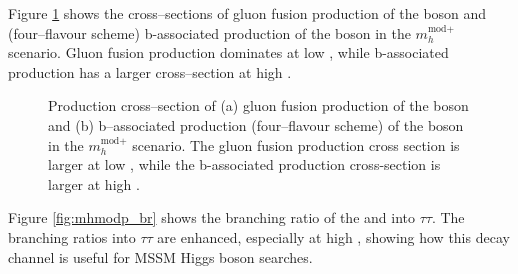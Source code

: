 Figure \ref{fig:mhmodp_xs} shows the cross--sections of
gluon fusion production of the \PHiggs boson and (four--flavour scheme) b-associated
production of the \PHiggsps boson in the $m_h^{\text{mod+}}$ scenario. Gluon fusion 
production dominates at low \tanb, while b-associated production has a larger cross--section
at high \tanb.

\begin{figure}[h!]
\begin{center}
\end{center}
\caption{Production cross--section of (a) gluon fusion production of the \PHiggs boson and
(b) b--associated production (four--flavour scheme) of the \PHiggsps boson in the $m_{h}^{\text{mod+}}$ scenario. The gluon fusion production cross section is larger at low \tanb, while
the b-associated production cross-section is larger at high \tanb.}
\label{fig:mhmodp_xs}
\end{figure}

Figure \ref{fig:mhmodp_br} shows the branching ratio of the \PHiggs and \PHiggsps 
into $\tau\tau$. The branching ratios into $\tau\tau$ are enhanced, especially at
high \tanb, showing how this decay channel is useful for MSSM Higgs boson searches.

